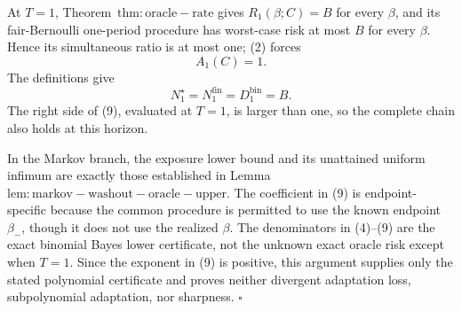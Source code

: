 At \(T=1\), Theorem~\(\mathrm{thm:oracle-rate}\) gives \(R_1(\beta;C)=B\) for every \(\beta\), and its fair-Bernoulli one-period procedure has worst-case risk at most \(B\) for every \(\beta\). Hence its simultaneous ratio is at most one; (2) forces
\[
A_1(C)=1.
\]
The definitions give
\[
N_1^\star=N_1^{\mathrm{fin}}=D_1^{\mathrm{bin}}=B.
\]
The right side of (9), evaluated at \(T=1\), is larger than one, so the complete chain also holds at this horizon.

In the Markov branch, the exposure lower bound and its unattained uniform infimum are exactly those established in Lemma~\(\mathrm{lem:markov-washout-oracle-upper}\). The coefficient in (9) is endpoint-specific because the common procedure is permitted to use the known endpoint \(\beta_-\), though it does not use the realized \(\beta\). The denominators in (4)--(9) are the exact binomial Bayes lower certificate, not the unknown exact oracle risk except when \(T=1\). Since the exponent in (9) is positive, this argument supplies only the stated polynomial certificate and proves neither divergent adaptation loss, subpolynomial adaptation, nor sharpness. \(\square\)